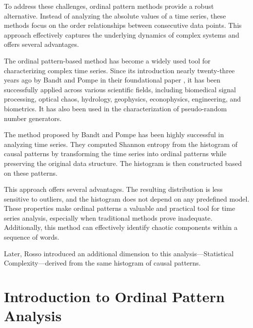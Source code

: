 To address these challenges, ordinal pattern methods provide a robust alternative. Instead of analyzing the absolute values of a time series, these methods focus on the order relationships between consecutive data points. This approach effectively captures the underlying dynamics of complex systems and offers several advantages.

The ordinal pattern-based method has become a widely used tool for characterizing complex time series. Since its introduction nearly twenty-three years ago by Bandt and Pompe in their foundational paper \cite{PhysRevLett.88.174102}, it has been successfully applied across various scientific fields, including biomedical signal processing, optical chaos, hydrology, geophysics, econophysics, engineering, and biometrics. It has also been used in the characterization of pseudo-random number generators.
   
The method proposed by Bandt and Pompe has been highly successful in analyzing time series. They computed Shannon entropy from the histogram of causal patterns by transforming the time series into ordinal patterns while preserving the original data structure. The histogram is then constructed based on these patterns.

This approach offers several advantages. The resulting distribution is less sensitive to outliers, and the histogram does not depend on any predefined model. These properties make ordinal patterns a valuable and practical tool for time series analysis, especially when traditional methods prove inadequate. Additionally, this method can effectively identify chaotic components within a sequence of words.

Later, Rosso \cite{Rosso2007} introduced an additional dimension to this analysis—Statistical Complexity—derived from the same histogram of causal patterns.

\section*{Introduction to Ordinal Pattern Analysis}


